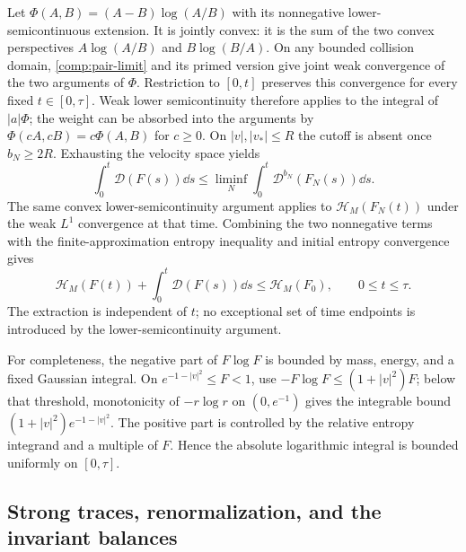 Let $\Phi(A,B)=(A-B)\log(A/B)$ with its nonnegative
lower-semicontinuous extension. It is jointly convex: it is the sum of
the two convex perspectives $A\log(A/B)$ and $B\log(B/A)$.
On any bounded collision domain, \eqref{comp:pair-limit} and its primed
version give joint weak convergence of the two arguments of $\Phi$.
Restriction to $[0,t]$ preserves this convergence for every fixed
$t\in[0,\tau]$. Weak lower semicontinuity therefore applies to the
integral of $|a|\Phi$; the weight can be absorbed into the arguments
by $\Phi(cA,cB)=c\Phi(A,B)$ for $c\ge0$.
On $|v|,|v_*|\le R$ the cutoff is absent once $b_N\ge2R$.
Exhausting the velocity space yields
\[
 \int_0^t\mathcal D(F(s))\dd s
 \le\liminf_N\int_0^t\mathcal D^{b_N}(F_N(s))\dd s.
\]
The same convex lower-semicontinuity argument applies to
$\mathcal H_M(F_N(t))$ under the weak $L^1$ convergence at that time.
Combining the two nonnegative terms with the finite-approximation
entropy inequality and initial entropy convergence gives
\begin{equation}\label{comp:limit-entropy}
 \mathcal H_M(F(t))+\int_0^t\mathcal D(F(s))\dd s
 \le\mathcal H_M(F_0),\qquad 0\le t\le\tau.
\end{equation}
The extraction is independent of $t$; no exceptional set of time
endpoints is introduced by the lower-semicontinuity argument.

For completeness, the negative part of $F\log F$ is bounded by mass,
energy, and a fixed Gaussian integral. On
$e^{-1-|v|^2}\le F<1$, use
$-F\log F\le(1+|v|^2)F$; below that threshold, monotonicity of
$-r\log r$ on $(0,e^{-1})$ gives the integrable bound
$(1+|v|^2)e^{-1-|v|^2}$.
The positive part is controlled by the relative entropy integrand and
a multiple of $F$. Hence the absolute logarithmic integral is bounded
uniformly on $[0,\tau]$.

\subsection{Strong traces, renormalization, and the invariant balances}

